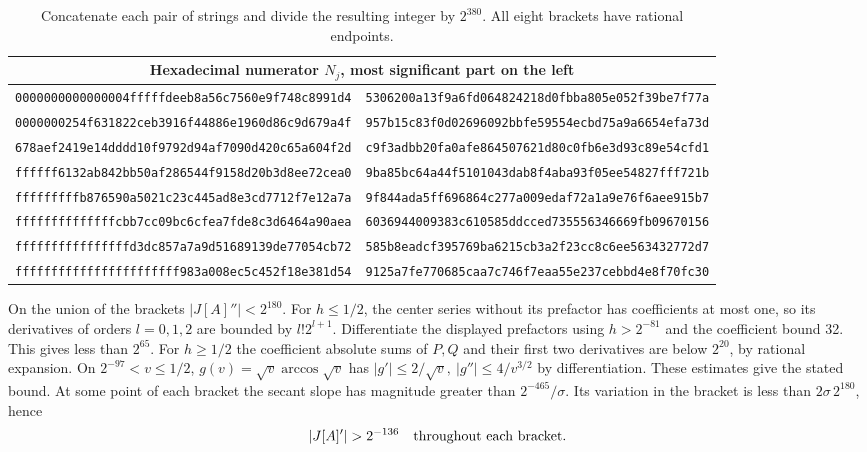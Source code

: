 \begin{table}[ht]
\centering\scriptsize
\begin{tabular}{@{}ll@{}}\toprule
\multicolumn{2}{c}{Hexadecimal numerator \(N_j\), most significant part on the left}\\ \midrule
\texttt{0000000000000004fffffdeeb8a56c7560e9f748c8991d4} & \texttt{5306200a13f9a6fd064824218d0fbba805e052f39be7f77a}\\
\texttt{0000000254f631822ceb3916f44886e1960d86c9d679a4f} & \texttt{957b15c83f0d02696092bbfe59554ecbd75a9a6654efa73d}\\
\texttt{678aef2419e14dddd10f9792d94af7090d420c65a604f2d} & \texttt{c9f3adbb20fa0afe864507621d80c0fb6e3d93c89e54cfd1}\\
\texttt{ffffff6132ab842bb50af286544f9158d20b3d8ee72cea0} & \texttt{9ba85bc64a44f5101043dab8f4aba93f05ee54827fff721b}\\
\texttt{fffffffffb876590a5021c23c445ad8e3cd7712f7e12a7a} & \texttt{9f844ada5ff696864c277a009edaf72a1a9e76f6aee915b7}\\
\texttt{ffffffffffffffcbb7cc09bc6cfea7fde8c3d6464a90aea} & \texttt{6036944009383c610585ddcced735556346669fb09670156}\\
\texttt{ffffffffffffffffd3dc857a7a9d51689139de77054cb72} & \texttt{585b8eadcf395769ba6215cb3a2f23cc8c6ee563432772d7}\\
\texttt{fffffffffffffffffffffff983a008ec5c452f18e381d54} & \texttt{9125a7fe770685caa7c746f7eaa55e237cebbd4e8f70fc30}\\
\bottomrule
\end{tabular}
\caption{Concatenate each pair of strings and divide the resulting integer by
\(2^{380}\). All eight brackets have rational endpoints.}\label{six:centers}
\end{table}

On the union of the brackets \(|J[A]''|<2^{180}\).
For \(h\le1/2\), the center series without its prefactor has coefficients
at most one, so its derivatives of orders \(l=0,1,2\) are bounded by
\(l!2^{l+1}\). Differentiate the displayed prefactors using \(h>2^{-81}\)
and the coefficient bound 32. This gives less than \(2^{65}\).
For \(h\ge1/2\) the coefficient absolute sums of \(P,Q\) and their first
two derivatives are below \(2^{20}\), by rational expansion.
On \(2^{-97}<v\le1/2\), \(g(v)=\sqrt v\arccos\sqrt v\) has
\(|g'|\le 2/\sqrt v,\ |g''|\le4/v^{3/2}\) by differentiation.
These estimates give the stated bound. At some point of each bracket
the secant slope has magnitude greater than \(2^{-465}/\sigma\).
Its variation in the bracket is less than \(2\sigma\,2^{180}\), hence
\begin{equation}
 |J[A]'|>2^{-136}\quad\hbox{throughout each bracket}.              \label{six:margins}
\end{equation}

